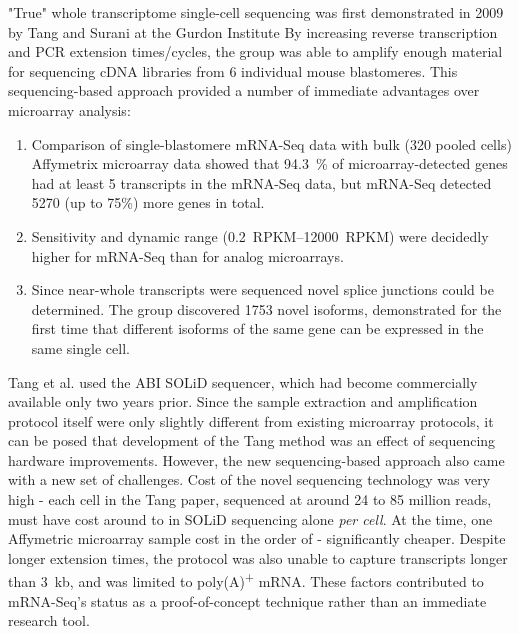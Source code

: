 
"True" whole transcriptome single-cell sequencing was first demonstrated in 2009 by Tang and Surani at the Gurdon Institute By increasing reverse transcription and PCR extension times/cycles, the group was able to amplify enough material for sequencing cDNA libraries from 6 individual mouse blastomeres. This sequencing-based approach provided a number of immediate advantages over microarray analysis:

\begin{enumerate}[noitemsep]
	\item Comparison of single-blastomere mRNA-Seq data with bulk (320 pooled cells) Affymetrix microarray data showed that \SI{94.3}{\percent} of microarray-detected genes had at least 5 transcripts in the mRNA-Seq data, but mRNA-Seq detected \num{5270} (up to 75\%) more genes in total.
	\item Sensitivity and dynamic range (\SIrange{0.2}{12000}{RPKM}) were decidedly higher for mRNA-Seq than for analog microarrays.
	\item Since near-whole transcripts were sequenced novel splice junctions could be determined. The group discovered \num{1753} novel isoforms, demonstrated for the first time that different isoforms of the same gene can be expressed in the same single cell.
\end{enumerate}

Tang et al. used the ABI SOLiD sequencer, which had become commercially available only two years prior. Since the sample extraction and amplification protocol itself were only slightly different from existing microarray protocols, it can be posed that development of the Tang method was an effect of sequencing hardware improvements. However, the new sequencing-based approach also came with a new set of challenges. Cost of the novel sequencing technology was very high - each cell in the Tang paper, sequenced at around 24 to 85 million reads, must have cost around  to  in SOLiD sequencing alone \textit{per cell}. At the time, one Affymetric microarray sample cost in the order of  - significantly cheaper. Despite longer extension times, the protocol was also unable to capture transcripts longer than \SI{3}{kb}, and was limited to poly(A)\textsuperscript{+} mRNA. These factors contributed to mRNA-Seq's status as a proof-of-concept technique rather than an immediate research tool.

